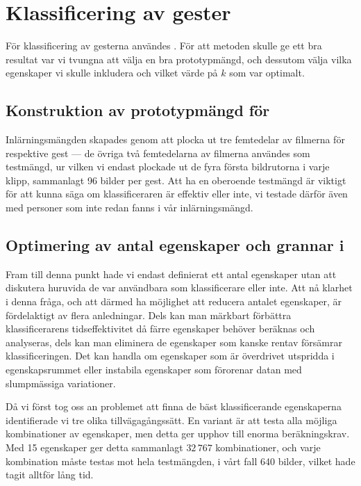 \documentclass[../rapport_MVEX01-11-05]{subfiles}
\begin{document}
\section{Klassificering av gester} 

För klassificering av gesterna användes \knn. För att metoden skulle
ge ett bra resultat var vi tvungna att välja
en bra prototypmängd, och dessutom välja vilka egenskaper vi skulle inkludera
och vilket värde på $k$ som var optimalt.

\subsection{Konstruktion av prototypmängd för \knn}
Inlärningsmängden skapades genom att plocka ut tre femtedelar av filmerna för
respektive gest --- de övriga två femtedelarna av filmerna 
användes som testmängd, ur vilken vi endast plockade ut
de fyra första bildrutorna i varje klipp, sammanlagt 96 bilder per gest.
Att ha en oberoende testmängd är viktigt för att kunna säga om klassificeraren är
effektiv eller inte, vi testade därför även med personer som inte redan 
fanns i vår inlärningsmängd.

\subsection{Optimering av antal egenskaper och grannar i \knn}\label{sec:metod_knn:optim}
Fram till denna punkt hade vi endast definierat ett antal egenskaper utan att
diskutera huruvida de var användbara som klassificerare eller inte. Att nå
klarhet i denna fråga, och att därmed ha möjlighet att reducera antalet
egenskaper, är
fördelaktigt av flera anledningar. Dels kan man märkbart förbättra
klassificerarens
tidseffektivitet då färre egenskaper behöver beräknas och analyseras, dels kan man
eliminera de egenskaper som kanske rentav försämrar klassificeringen.
Det kan handla om egenskaper som är överdrivet utspridda i
egenskapsrummet eller instabila egenskaper som förorenar datan med slumpmässiga
variationer.

Då vi först tog oss an problemet att finna de bäst klassificerande
egenskaperna identifierade vi tre olika tillvägagångssätt. En variant är att
testa alla möjliga kombinationer av egenskaper,
men detta ger upphov till enorma beräkningskrav. Med 15
egenskaper ger detta sammanlagt $32\,767$ kombinationer, och varje kombination
måste testas mot hela testmängden, i vårt fall 640 bilder, vilket hade tagit
alltför lång tid.
 
\end{document}
